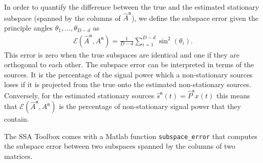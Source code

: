 \documentclass{article}
\newcommand{\1}{\ensuremath{\mathds{1}}}
\newcommand{\s}{\ensuremath{\mathfrak{s}}}
\newcommand{\n}{\ensuremath{\mathfrak{n}}}
\newcommand{\0}{\ensuremath{0}}
\begin{document}
\begin{appendices}
In order to quantify the difference between the true and the estimated stationary subspace 
(spanned by the columns of $\hat{A}^\n$), we define the subspace error given the principle 
angles $\theta_1, \ldots, \theta_{D-d}$ as 
\begin{align*}
	\mathcal{E}(\hat{A}^\n , A^\n ) = \frac{1}{D-d} \sum_{i=1}^{D-d} \sin^2 (\theta_i) .
\end{align*}
This error is zero when the true subspaces are identical and one if they are orthogonal to 
each other. The subspace error can be interpreted in terms of the sources. It is the 
percentage of the signal power which a non-stationary sources loses if it is projected 
from the true onto the estimated non-stationary sources. Conversely, for the estimated stationary
sources $\hat{s}^\n(t) = \hat{P}^\s x(t)$ this means that $\mathcal{E}(\hat{A}^\n , A^\n )$ 
is the percentage of non-stationary signal power that they contain. 

The SSA Toolbox comes with a Matlab function \texttt{subspace\_error} that computes the subspace
error between two subspaces spanned by the columns of two matrices. 

\end{appendices}


\newpage


\end{document}
